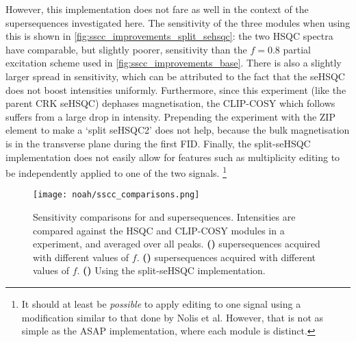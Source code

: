 However, this implementation does not fare as well in the context of the  supersequences investigated here.
The sensitivity of the three modules when using this is shown in \cref{fig:sscc_improvements_split_sehsqc}: the two HSQC spectra have comparable, but slightly poorer, sensitivity than the $f = 0.8$ partial excitation scheme used in \cref{fig:sscc_improvements_base}.
There is also a slightly larger spread in sensitivity, which can be attributed to the fact that the seHSQC does not boost intensities uniformly.
Furthermore, since this experiment (like the parent CRK seHSQC) dephases  magnetisation, the CLIP-COSY which follows suffers from a large drop in intensity.
Prepending the experiment with the ZIP element to make a `split seHSQC2' does not help, because the bulk magnetisation is in the transverse plane during the first FID.
Finally, the split-seHSQC implementation does not easily allow for features such as multiplicity editing to be independently applied to one of the two signals.%
\footnote{It should at least be \textit{possible} to apply editing to one signal using a modification similar to that done by Nolis et al.\autocite{Nolis2019JMR} However, that is not as simple as the ASAP implementation, where each module is distinct.}

\begin{figure}[!ht]
    \centering
    \texttt{[image: noah/sscc\_comparisons.png]}%
    {\label{fig:sscc_comparisons_sscc}}%
    {\label{fig:sscc_comparisons_sspcc}}%
    {\label{fig:sscc_comparisons_split_sehsqc}}%
    \caption[Sensitivity comparisons for  and  supersequences]{
        Sensitivity comparisons for  and  supersequences.
        Intensities are compared against the HSQC and CLIP-COSY modules in a  experiment, and averaged over all peaks.
        \textbf{()}  supersequences acquired with different values of $f$.
        \textbf{()}  supersequences acquired with different values of $f$.
        \textbf{()} Using the split-seHSQC implementation.
    }
    \label{fig:sscc_comparisons}
\end{figure}

